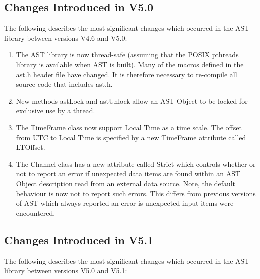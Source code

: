 \documentclass[twoside,11pt]{starlink}
\begin{document}
\subsection{Changes Introduced in V5.0}

The following describes the most significant changes which
occurred in the AST library between versions V4.6 and V5.0:

\begin{enumerate}


\item The AST library is now thread-safe (assuming that the POSIX pthreads
library is available when AST is built). Many of the macros defined in
the ast.h header file have changed. It is therefore necessary to
re-compile all source code that includes ast.h.

\item New methods astLock and astUnlock allow an AST Object to be locked
for exclusive use by a thread.

\item The TimeFrame class now support Local Time as a time scale. The offset
from UTC to Local Time is specified by a new TimeFrame attribute called
LTOffset.

\item The Channel class has a new attribute called Strict which controls
whether or not to report an error if unexpected data items are found
within an AST Object description read from an external data source. Note,
the default behaviour is now not to report such errors. This differs from
previous versions of AST which always reported an error is unexpected
input items were encountered.

\end{enumerate}

\subsection{Changes Introduced in V5.1}

The following describes the most significant changes which occurred in the
AST library between versions V5.0 and V5.1:
\end{document}
